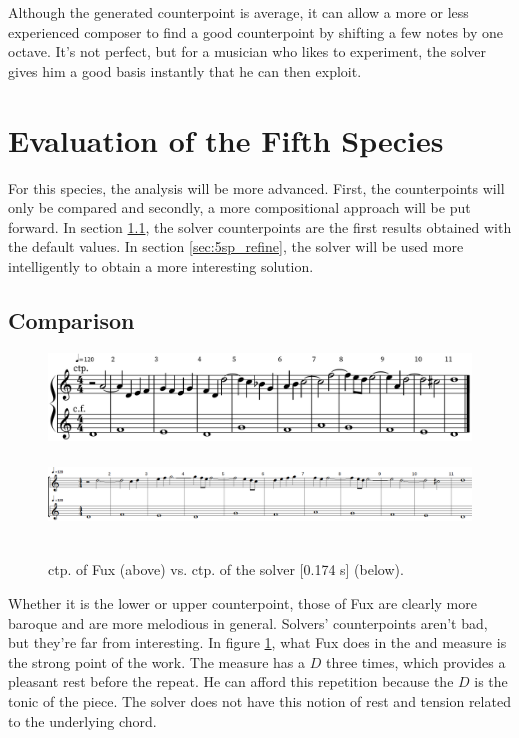 Although the generated counterpoint is average, it can allow a more or less experienced composer to find a good counterpoint by shifting a few notes by one octave. It's not perfect, but for a musician who likes to experiment, the solver gives him a good basis instantly that he can then exploit.

\section{Evaluation of the Fifth Species}
For this species, the analysis will be more advanced. First, the counterpoints will only be compared and secondly, a more compositional approach will be put forward. In section \ref{sec:5sp_comp}, the solver counterpoints are the first results obtained with the default values. In section \ref{sec:5sp_refine}, the solver will be used more intelligently to obtain a more interesting solution.
\subsection{Comparison}\label{sec:5sp_comp}
\begin{figure}[h]
    \centering
    \includegraphics[height=\fhs]{Images/fux_5spA.png}
    \includegraphics[width=\textwidth, height=1in]{Images/solver_5spA.png}
    \caption{ ctp. of Fux (above) vs. ctp. of the solver [0.174 s] (below).}
    \label{fig:eval_5spA}
\end{figure}

Whether it is the lower or upper counterpoint, those of Fux are clearly more baroque and are more melodious in general. Solvers' counterpoints aren't bad, but they're far from interesting. In figure \ref{fig:eval_5spA}, what Fux does in the  and  measure is the strong point of the work. The  measure has a $D$ three times, which provides a pleasant rest before the repeat. He can afford this repetition because the $D$ is the tonic of the piece. The solver does not have this notion of rest and tension related to the underlying chord.

